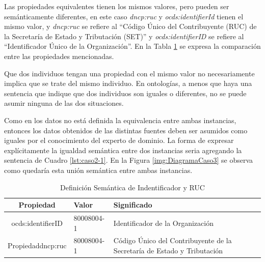  Las propiedades equivalentes tienen los mismos valores, pero pueden ser semánticamente diferentes, en este caso \textit{dncp:ruc} y \textit{ocds:identifierId} tienen el mismo valor, y \textit{dncp:ruc} se refiere al “Código Único del Contribuyente (RUC) de la Secretaría de Estado y Tributación (SET)” y \textit{ocds:identifierID} se refiere al “Identificador Único de la Organización”. En la Tabla \ref{table:semanticaID} se expresa la comparación entre las propiedades mencionadas.

 Que dos individuos tengan una propiedad con el mismo valor no necesariamente implica que se trate del mismo individuo. En ontologías, a menos que haya una sentencia que indique que dos individuos son iguales o diferentes, no se puede asumir ninguna de las dos situaciones. 

 Como en los datos no está definida la equivalencia entre ambas instancias, entonces los datos obtenidos de las distintas fuentes deben ser asumidos como iguales por el conocimiento del experto de dominio. La forma de expresar explícitamente la igualdad semántica entre dos instancias seria agregando la sentencia de Cuadro \ref{lst:caso2-1}. En la Figura \ref{img:DiagramaCaso3} se observa como quedaría esta unión semántica entre ambas instancias.
 


 \begin{table}[!htb]
    \centering
    \caption{Definición Semántica de Indentificador y RUC}
    \label{table:semanticaID}
    \resizebox{15cm}{!} {
    \begin{tabular}{|c|l|l|}
    \hline
    
Propiedad & Valor &  Significado \\ \hline

ocds:identifierID  & 80008004-1 &  Identificador de la Organización \\ \hline
Propiedaddncp:ruc & 80008004-1 &  Código Único del Contribuyente de la Secretaría de Estado y Tributación \\ \hline

    \end{tabular}
    }
    \end{table}

